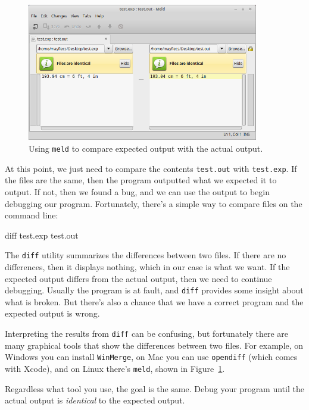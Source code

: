 \documentclass[12pt]{book}
\theoremstyle{exercise}
\begin{document}
\begin{figure}[!ht]
\begin{center}
\includegraphics[width=0.9\textwidth]{figs/meld.png}
\caption{Using {\tt meld} to compare expected output with the actual output.}
\label{fig.meld}
\end{center}
\end{figure}

At this point, we just need to compare the contents {\tt test.out} with {\tt test.exp}.
If the files are the same, then the program outputted what we expected it to output.
If not, then we found a bug, and we can use the output to begin debugging our program.
Fortunately, there's a simple way to compare files on the command line:

\begin{stdout}
diff test.exp test.out
\end{stdout}

The {\tt diff} utility summarizes the differences between two files.
If there are no differences, then it displays nothing, which in our case is what we want.
If the expected output differs from the actual output, then we need to continue debugging.
Usually the program is at fault, and {\tt diff} provides some insight about what is broken.
But there's also a chance that we have a correct program and the expected output is wrong.

Interpreting the results from {\tt diff} can be confusing, but fortunately there are many graphical tools that show the differences between two files.
For example, on Windows you can install {\tt WinMerge}, on Mac you can use {\tt opendiff} (which comes with Xcode), and on Linux there's {\tt meld}, shown in Figure~\ref{fig.meld}.

Regardless what tool you use, the goal is the same.
Debug your program until the actual output is {\em identical} to the expected output.
\end{document}
